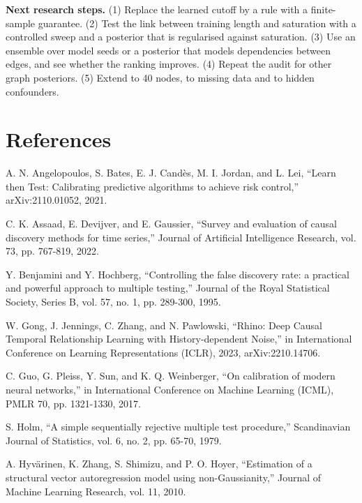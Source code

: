 \documentclass[10pt]{article}
\begin{document}
\textbf{Next research steps.} (1) Replace the learned cutoff by a rule with a finite-sample guarantee. (2) Test the link between training length and saturation with a controlled sweep and a posterior that is regularised against saturation. (3) Use an ensemble over model seeds or a posterior that models dependencies between edges, and see whether the ranking improves. (4) Repeat the audit for other graph posteriors. (5) Extend to 40 nodes, to missing data and to hidden confounders.

\section*{References}
\begingroup\small\setlength{\parskip}{3pt}
\hangindent=0.2in\noindent A. N. Angelopoulos, S. Bates, E. J. Candès, M. I. Jordan, and L. Lei, ``Learn then Test: Calibrating predictive algorithms to achieve risk control,'' arXiv:2110.01052, 2021.\par
\hangindent=0.2in\noindent C. K. Assaad, E. Devijver, and E. Gaussier, ``Survey and evaluation of causal discovery methods for time series,'' Journal of Artificial Intelligence Research, vol. 73, pp. 767-819, 2022.\par
\hangindent=0.2in\noindent Y. Benjamini and Y. Hochberg, ``Controlling the false discovery rate: a practical and powerful approach to multiple testing,'' Journal of the Royal Statistical Society, Series B, vol. 57, no. 1, pp. 289-300, 1995.\par
\hangindent=0.2in\noindent W. Gong, J. Jennings, C. Zhang, and N. Pawlowski, ``Rhino: Deep Causal Temporal Relationship Learning with History-dependent Noise,'' in International Conference on Learning Representations (ICLR), 2023, arXiv:2210.14706.\par
\hangindent=0.2in\noindent C. Guo, G. Pleiss, Y. Sun, and K. Q. Weinberger, ``On calibration of modern neural networks,'' in International Conference on Machine Learning (ICML), PMLR 70, pp. 1321-1330, 2017.\par
\hangindent=0.2in\noindent S. Holm, ``A simple sequentially rejective multiple test procedure,'' Scandinavian Journal of Statistics, vol. 6, no. 2, pp. 65-70, 1979.\par
\hangindent=0.2in\noindent A. Hyvärinen, K. Zhang, S. Shimizu, and P. O. Hoyer, ``Estimation of a structural vector autoregression model using non-Gaussianity,'' Journal of Machine Learning Research, vol. 11, 2010.\par
\end{document}
